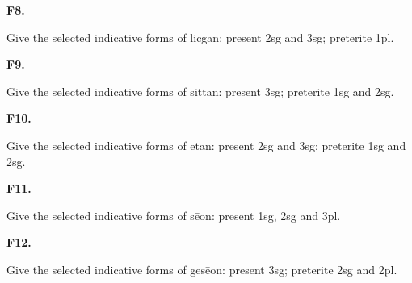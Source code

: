 \par\begin{minipage}{\linewidth}\raggedright
\textbf{F8.}

Give the selected indicative forms of licgan: present 2sg and 3sg; preterite 1pl.

\end{minipage}\par\addvspace{4pt}

\par\begin{minipage}{\linewidth}\raggedright
\textbf{F9.}

Give the selected indicative forms of sittan: present 3sg; preterite 1sg and 2sg.

\end{minipage}\par\addvspace{4pt}

\par\begin{minipage}{\linewidth}\raggedright
\textbf{F10.}

Give the selected indicative forms of etan: present 2sg and 3sg; preterite 1sg and 2sg.

\end{minipage}\par\addvspace{4pt}

\par\begin{minipage}{\linewidth}\raggedright
\textbf{F11.}

Give the selected indicative forms of sēon: present 1sg, 2sg and 3pl.

\end{minipage}\par\addvspace{4pt}

\par\begin{minipage}{\linewidth}\raggedright
\textbf{F12.}

Give the selected indicative forms of gesēon: present 3sg; preterite 2sg and 2pl.

\end{minipage}\par\addvspace{4pt}

